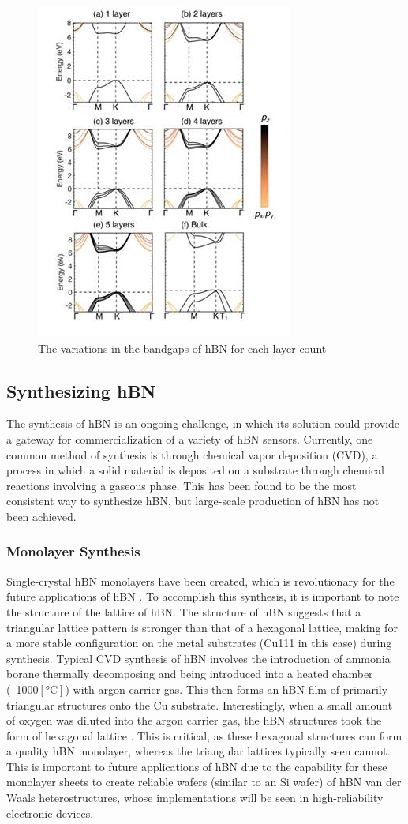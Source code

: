 \documentclass[conference]{IEEEtran}
\begin{document}
\begin{figure}[h]
  \centering
  \includegraphics[width=.45\textwidth]{Figures/hBN-Layers}
  \caption{The variations in the bandgaps of hBN for each layer count}
  \label{fig:1}
\end{figure}
 
\subsection{Synthesizing hBN}

The synthesis of hBN is an ongoing challenge, in which its solution could provide a gateway for commercialization of a variety of hBN sensors. Currently, one common method of synthesis is through chemical vapor deposition (CVD), a process in which a solid material is deposited on a substrate through chemical reactions involving a gaseous phase. This has been found to be the most consistent way to synthesize hBN, but large-scale production of hBN has not been achieved.

\subsubsection{Monolayer Synthesis}

Single-crystal hBN monolayers have been created, which is revolutionary for the future applications of hBN \cite{jb2}. To accomplish this synthesis, it is important to note the structure of the lattice of hBN. The structure of hBN suggests that a triangular lattice pattern is stronger than that of a hexagonal lattice, making for a more stable configuration on the metal substrates (Cu111 in this case) during synthesis. Typical CVD synthesis of hBN involves the introduction of ammonia borane thermally decomposing and being introduced into a heated chamber (~1000$[\si{\celsius}]$) with argon carrier gas. This then forms an hBN film of primarily triangular structures onto the Cu substrate. Interestingly, when a small amount of oxygen was diluted into the argon carrier gas, the hBN structures took the form of hexagonal lattice \cite{jb2}. This is critical, as these hexagonal structures can form a quality hBN monolayer, whereas the triangular lattices typically seen cannot. This is important to future applications of hBN due to the capability for these monolayer sheets to create reliable wafers (similar to an Si wafer) of hBN van der Waals heterostructures, whose implementations will be seen in high-reliability electronic devices.
 
\end{document}
